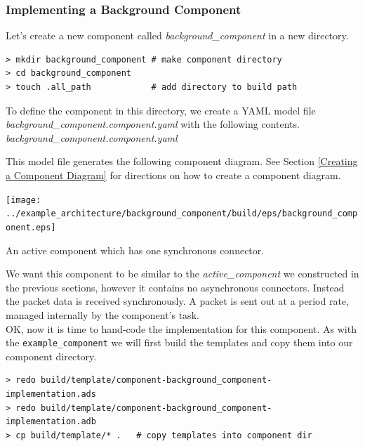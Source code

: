 \subsubsection{Implementing a Background Component} \label{Implementing a Background Component}

Let's create a new component called \textit{background\_component} in a new directory.

\vspace{5mm} %
\begin{verbatim}
> mkdir background_component # make component directory
> cd background_component 
> touch .all_path            # add directory to build path
\end{verbatim}
\vspace{5mm} %

To define the component in this directory, we create a YAML model file \textit{background\_component.component.yaml} with the following contents. \\

\textit{background\_component.component.yaml}

This model file generates the following component diagram. See Section \ref{Creating a Component Diagram} for directions on how to create a component diagram.

\vspace{5mm} %
\texttt{[image: ../example\_architecture/background\_component/build/eps/background\_component.eps]}
\caption{An active component which has one synchronous connector.}
\vspace{5mm} %

We want this component to be similar to the \textit{active\_component} we constructed in the previous sections, however it contains no asynchronous connectors. Instead the packet data is received synchronously. A packet is sent out at a period rate, managed internally by the component's task. \\

OK, now it is time to hand-code the implementation for this component. As with the \texttt{example\_component} we will first build the templates and copy them into our component directory.

\vspace{5mm} %
\begin{verbatim}
> redo build/template/component-background_component-implementation.ads 
> redo build/template/component-background_component-implementation.adb 
> cp build/template/* .   # copy templates into component dir
\end{verbatim}
\vspace{5mm} %

